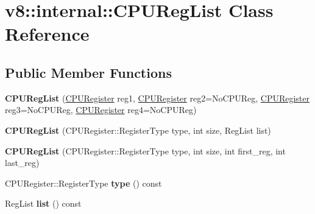 \hypertarget{classv8_1_1internal_1_1_c_p_u_reg_list}{}\section{v8\+:\+:internal\+:\+:C\+P\+U\+Reg\+List Class Reference}
\label{classv8_1_1internal_1_1_c_p_u_reg_list}
\subsection*{Public Member Functions}
\begin{DoxyCompactItemize}
\item 
{\bfseries C\+P\+U\+Reg\+List} (\hyperlink{structv8_1_1internal_1_1_c_p_u_register}{C\+P\+U\+Register} reg1, \hyperlink{structv8_1_1internal_1_1_c_p_u_register}{C\+P\+U\+Register} reg2=No\+C\+P\+U\+Reg, \hyperlink{structv8_1_1internal_1_1_c_p_u_register}{C\+P\+U\+Register} reg3=No\+C\+P\+U\+Reg, \hyperlink{structv8_1_1internal_1_1_c_p_u_register}{C\+P\+U\+Register} reg4=No\+C\+P\+U\+Reg)\hypertarget{classv8_1_1internal_1_1_c_p_u_reg_list_aedb9061d0739489626b7b7a53537039a}{}\label{classv8_1_1internal_1_1_c_p_u_reg_list_aedb9061d0739489626b7b7a53537039a}

\item 
{\bfseries C\+P\+U\+Reg\+List} (C\+P\+U\+Register\+::\+Register\+Type type, int size, Reg\+List list)\hypertarget{classv8_1_1internal_1_1_c_p_u_reg_list_a31ee71710ba6ff07cb8d70cf0efede07}{}\label{classv8_1_1internal_1_1_c_p_u_reg_list_a31ee71710ba6ff07cb8d70cf0efede07}

\item 
{\bfseries C\+P\+U\+Reg\+List} (C\+P\+U\+Register\+::\+Register\+Type type, int size, int first\+\_\+reg, int last\+\_\+reg)\hypertarget{classv8_1_1internal_1_1_c_p_u_reg_list_a49055381096146c65ff6e11786b56067}{}\label{classv8_1_1internal_1_1_c_p_u_reg_list_a49055381096146c65ff6e11786b56067}

\item 
C\+P\+U\+Register\+::\+Register\+Type {\bfseries type} () const \hypertarget{classv8_1_1internal_1_1_c_p_u_reg_list_a67002d21175531517379d5a52d0b764f}{}\label{classv8_1_1internal_1_1_c_p_u_reg_list_a67002d21175531517379d5a52d0b764f}

\item 
Reg\+List {\bfseries list} () const \hypertarget{classv8_1_1internal_1_1_c_p_u_reg_list_a78752eaebdc50dd237b6037e31ac57f0}{}\label{classv8_1_1internal_1_1_c_p_u_reg_list_a78752eaebdc50dd237b6037e31ac57f0}


\end{DoxyCompactItemize}
